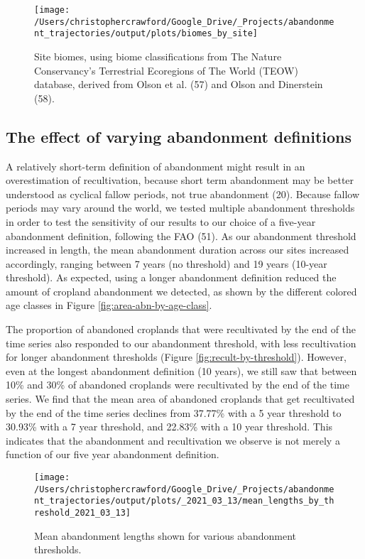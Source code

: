 \documentclass[9pt,twocolumn,twoside,lineno]{pnas-new}
\begin{document}
\begin{figure}
\texttt{[image: /Users/christophercrawford/Google\_Drive/\_Projects/abandonment\_trajectories/output/plots/biomes\_by\_site]} \caption{Site biomes, using biome classifications from The Nature Conservancy's Terrestrial Ecoregions of The World (TEOW) database, derived from Olson et al. (57) and Olson and Dinerstein (58).}\label{fig:site-biomes}
\end{figure}

\hypertarget{abn-thresholds}{%
\subsection{The effect of varying abandonment definitions}\label{abn-thresholds}}

A relatively short-term definition of abandonment might result in an overestimation of recultivation, because short term abandonment may be better understood as cyclical fallow periods, not true abandonment (20).
Because fallow periods may vary around the world, we tested multiple abandonment thresholds in order to test the sensitivity of our results to our choice of a five-year abandonment definition, following the FAO (51).
As our abandonment threshold increased in length, the mean abandonment duration across our sites increased accordingly, ranging between 7 years (no threshold) and 19 years (10-year threshold).
As expected, using a longer abandonment definition reduced the amount of cropland abandonment we detected, as shown by the different colored age classes in Figure \ref{fig:area-abn-by-age-class}.

The proportion of abandoned croplands that were recultivated by the end of the time series also responded to our abandonment threshold, with less recultivation for longer abandonment thresholds (Figure \ref{fig:recult-by-threshold}).
However, even at the longest abandonment definition (10 years), we still saw that between 10\% and 30\% of abandoned croplands were recultivated by the end of the time series.
We find that the mean area of abandoned croplands that get recultivated by the end of the time series declines from 37.77\% with a 5 year threshold to 30.93\% with a 7 year threshold, and 22.83\% with a 10 year threshold.
This indicates that the abandonment and recultivation we observe is not merely a function of our five year abandonment definition.



\begin{figure}
\texttt{[image: /Users/christophercrawford/Google\_Drive/\_Projects/abandonment\_trajectories/output/plots/\_2021\_03\_13/mean\_lengths\_by\_threshold\_2021\_03\_13]} \caption{Mean abandonment lengths shown for various abandonment thresholds.}\label{fig:abn-thresholds-mean-duration}
\end{figure}
\end{document}
